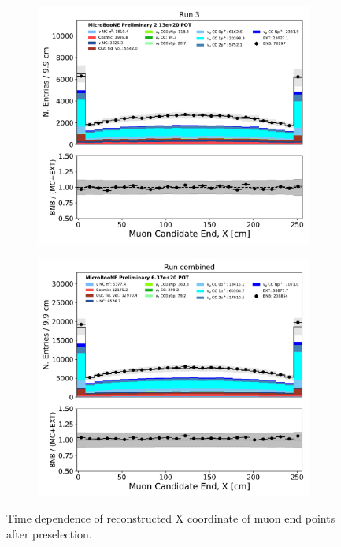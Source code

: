 \begin{figure}[hbt!]
\begin{center}
\begin{subfigure}[b]{0.35\textwidth}
    \end{subfigure}
    \begin{subfigure}[b]{0.35\textwidth}
        \centering
        \includegraphics[width=1.00\textwidth]{NuMuCCsel/Images/Ryan/Run3_nocrt/trk_sce_end_x_v_08052020_presel_samples_longest_noCRT_event_category.pdf}
    \end{subfigure} %
    \begin{subfigure}[b]{0.35\textwidth}
        \centering
        \includegraphics[width=1.00\textwidth]{NuMuCCsel/Images/Ryan/combined/trk_sce_end_x_v_08052020_presel_samples_longest_noCRT_event_category.pdf}
    \end{subfigure}
\caption{Time dependence of reconstructed X coordinate of muon end points after preselection.}
\label{fig:NuMuCCsel:timedep:trkendx}
\end{center}
\end{figure}

